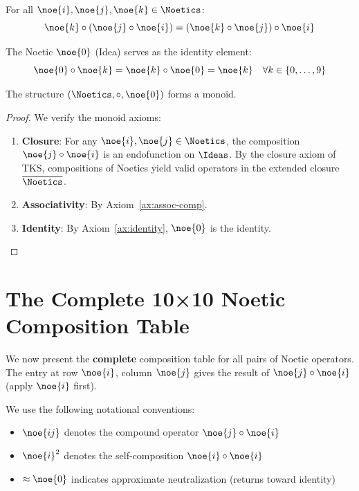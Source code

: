 \begin{axiom}
\label{ax:assoc-comp}
For all $\noe{i}, \noe{j}, \noe{k} \in \Noetics$:
\[
\noe{k} \circ (\noe{j} \circ \noe{i}) = (\noe{k} \circ \noe{j}) \circ \noe{i}
\]
\end{axiom}

\begin{axiom}
\label{ax:identity}
The Noetic $\noe{0}$ (Idea) serves as the identity element:
\[
\noe{0} \circ \noe{k} = \noe{k} \circ \noe{0} = \noe{k} \quad \forall k \in \{0,\ldots,9\}
\]
\end{axiom}

\begin{theorem}
\label{thm:monoid}
The structure $(\Noetics, \circ, \noe{0})$ forms a monoid.
\end{theorem}

\begin{proof}
We verify the monoid axioms:
\begin{enumerate}
  \item \textbf{Closure}: For any $\noe{i}, \noe{j} \in \Noetics$, the composition $\noe{j} \circ \noe{i}$ is an endofunction on $\Ideas$. By the closure axiom of TKS, compositions of Noetics yield valid operators in the extended closure $\overline{\Noetics}$.
  \item \textbf{Associativity}: By Axiom~\ref{ax:assoc-comp}.
  \item \textbf{Identity}: By Axiom~\ref{ax:identity}, $\noe{0}$ is the identity.
\end{enumerate}
\end{proof}

\section{The Complete 10×10 Noetic Composition Table}

We now present the \textbf{complete} composition table for all pairs of Noetic operators. The entry at row $\noe{i}$, column $\noe{j}$ gives the result of $\noe{j} \circ \noe{i}$ (apply $\noe{i}$ first).

\begin{definition}
\label{def:comp-notation}
We use the following notational conventions:
\begin{itemize}
  \item $\noe{ij}$ denotes the compound operator $\noe{j} \circ \noe{i}$
  \item $\noe{i}^2$ denotes the self-composition $\noe{i} \circ \noe{i}$
  \item $\approx \noe{0}$ indicates approximate neutralization (returns toward identity)
\end{itemize}
\end{definition}

